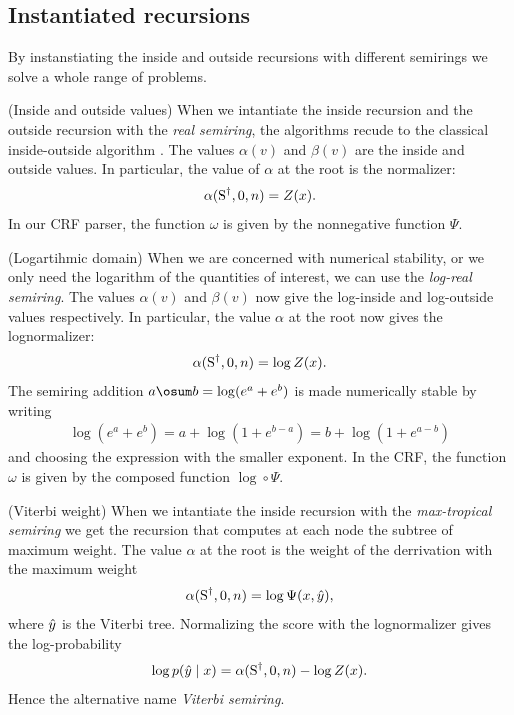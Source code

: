 \subsection{Instantiated recursions}

By instanstiating the inside and outside recursions with different semirings we solve a whole range of problems.

\begin{example}{(Inside and outside values)}
  When we intantiate the inside recursion and the outside recursion with the \textit{real semiring}, the algorithms recude to the classical inside-outside algorithm \citep{baker1979trainable}. The values $\alpha(v)$ and $\beta(v)$ are the inside and outside values. In particular, the value of $\alpha$ at the root is the normalizer:
  \begin{align*}
    \alpha(\text{S}^{\dagger}, 0, n) = Z(x).
  \end{align*}
  In our CRF parser, the function $\omega$ is given by the nonnegative function $\Psi$.
\end{example}

\begin{example}{(Logartihmic domain)}
  When we are concerned with numerical stability, or we only need the logarithm of the quantities of interest, we can use the \textit{log-real semiring}. The values $\alpha(v)$ and $\beta(v)$ now give the log-inside and log-outside values respectively. In particular, the value $\alpha$ at the root now gives the lognormalizer:
  \begin{align*}
    \alpha(\text{S}^{\dagger}, 0, n) = \log Z(x).
  \end{align*}
  The semiring addition $a \osum b = \log(e^{a} + e^{b})$ is made numerically stable by writing
  \begin{align*}
    \log(e^{a} + e^{b}) = a + \log(1 + e^{b-a}) = b + \log(1 + e^{a-b})
  \end{align*}
  and choosing the expression with the smaller exponent. In the CRF, the function $\omega$ is given by the composed function $\log \circ \Psi$.
\end{example}

\begin{example}{(Viterbi weight)}
  \label{ex:vit-weight}
  When we intantiate the inside recursion with the \textit{max-tropical semiring} we get the recursion that computes at each node the subtree of maximum weight. The value $\alpha$ at the root is the weight of the derrivation with the maximum weight
  \begin{align*}
    \alpha(\text{S}^{\dagger}, 0, n) = \log \Psi(x, \hat{y}),
  \end{align*}
  where $\hat{y}$ is the Viterbi tree. Normalizing the score with the lognormalizer gives the log-probability
  \begin{align*}
    \log p(\hat{y} \mid x) = \alpha(\text{S}^{\dagger}, 0, n) - \log Z(x).
  \end{align*}
  Hence the alternative name \textit{Viterbi semiring}.
\end{example}


